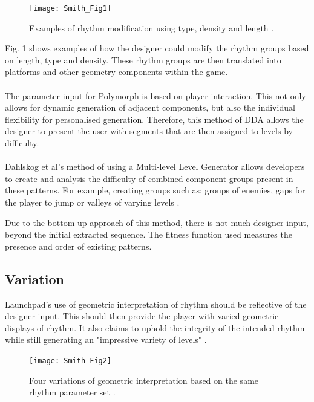 \documentclass{scrartcl}
\begin{document}
\begin{figure}[h]
\texttt{[image: Smith\_Fig1]}
\centering
\caption{Examples of rhythm modification using type, density and length \cite{Smith2011}.}
\end{figure}
Fig. 1 shows examples of how the designer could modify the rhythm groups based on length, type and density. These rhythm groups are then translated into platforms and other geometry components within the game. \\  \\
The parameter input for Polymorph is based on player interaction. This not only allows for dynamic generation of adjacent components, but also the individual flexibility for personalised generation. Therefore, this method of DDA allows the designer to present the user with segments that are then assigned to levels by difficulty. \\ \\
Dahlskog et al's method of using a Multi-level Level Generator allows developers to create and analysis the difficulty of combined component groups present in these patterns. For example, creating groups such as: groups of enemies, gaps for the player to jump or valleys of varying levels \cite{Dahlskog2014}. 

Due to the bottom-up approach of this method, there is not much designer input, beyond the initial extracted sequence. The fitness function used measures the presence and order of existing patterns.

\subsection{Variation}

Launchpad's use of geometric interpretation of rhythm should be reflective of the designer input. This should then provide the player with varied geometric displays of rhythm. It also claims to uphold the integrity of the intended rhythm while still generating an "impressive variety of levels" \cite{Smith2011}. \\
\begin{figure}[h]
\texttt{[image: Smith\_Fig2]}
\centering
\caption{Four variations of geometric interpretation based on the same rhythm parameter set \cite{Smith2011}.}
\end{figure}
\end{document}
